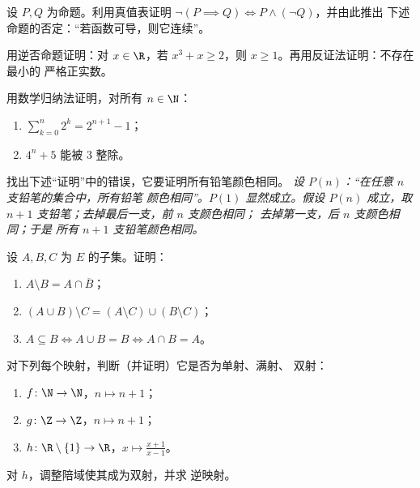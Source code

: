 \begin{exercise}[$\star$]\label{exo:b1:logic:2}
设 $P, Q$ 为命题。利用真值表证明
$\lnot(P \implies Q) \iff P \land (\lnot Q)$，并由此推出
下述命题的否定：“若函数可导，则它连续”。
\end{exercise}

\begin{exercise}[$\star$]\label{exo:b1:logic:3}
用逆否命题证明：对 $x \in \R$，若 $x^3 + x \geq 2$，则
$x \geq 1$。再用反证法证明：不存在最小的
严格正实数。
\end{exercise}

\begin{exercise}[$\star$]\label{exo:b1:logic:4}
用数学归纳法证明，对所有 $n \in \N$：
\begin{enumerate}
  \item $\sum_{k=0}^{n} 2^k = 2^{n+1} - 1$；
  \item $4^n + 5$ 能被 $3$ 整除。
\end{enumerate}
\end{exercise}

\begin{exercise}[$\star$]\label{exo:b1:logic:5}
找出下述“证明”中的错误，它要证明所有铅笔颜色相同。
\emph{设 $P(n)$：“在任意 $n$ 支铅笔的集合中，所有铅笔
颜色相同”。$P(1)$ 显然成立。假设 $P(n)$ 成立，取 $n+1$
支铅笔；去掉最后一支，前 $n$ 支颜色相同；
去掉第一支，后 $n$ 支颜色相同；于是
所有 $n+1$ 支铅笔颜色相同。}
\end{exercise}

\begin{exercise}[$\star$]\label{exo:b1:logic:6}
设 $A, B, C$ 为 $E$ 的子集。证明：
\begin{enumerate}
  \item $A \setminus B = A \cap \overline{B}$；
  \item $(A \cup B) \setminus C = (A \setminus C) \cup (B \setminus
        C)$；
  \item $A \subseteq B \iff A \cup B = B \iff A \cap B = A$。
\end{enumerate}
\end{exercise}

\begin{exercise}[$\star\star$]\label{exo:b1:logic:7}
对下列每个映射，判断（并证明）它是否为单射、满射、
双射：
\begin{enumerate}
  \item $f \colon \N \to \N$，$n \mapsto n + 1$；
  \item $g \colon \Z \to \Z$，$n \mapsto n + 1$；
  \item $h \colon \R \setminus \{1\} \to \R$，$x \mapsto
        \frac{x+1}{x-1}$。
\end{enumerate}
对 $h$，调整陪域使其成为双射，并求
逆映射。
\end{exercise}

